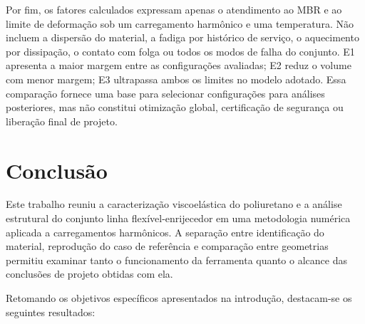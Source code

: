 \documentclass[arial,centeredequations,english,brazilian,oneside,section=TITLE]{ifes8}
\begin{document}
Por fim, os fatores calculados expressam apenas o atendimento ao MBR e
ao limite de deformação sob um carregamento harmônico e uma temperatura.
Não incluem a dispersão do material, a fadiga por histórico de serviço,
o aquecimento por dissipação, o contato com folga ou todos os modos de
falha do conjunto. E1 apresenta a maior margem entre as configurações
avaliadas; E2 reduz o volume com menor margem; E3 ultrapassa ambos os
limites no modelo adotado. Essa comparação fornece uma base para
selecionar configurações para análises posteriores, mas não constitui
otimização global, certificação de segurança ou liberação final de projeto.


\chapter{Conclusão}
\label{sec:conclusao}

Este trabalho reuniu a caracterização viscoelástica do poliuretano e a
análise estrutural do conjunto linha flexível-enrijecedor em uma
metodologia numérica aplicada a carregamentos harmônicos. A separação
entre identificação do material, reprodução do caso de referência e
comparação entre geometrias permitiu examinar tanto o funcionamento da
ferramenta quanto o alcance das conclusões de projeto obtidas com ela.

Retomando os objetivos específicos apresentados na introdução,
destacam-se os seguintes resultados:
\end{document}
